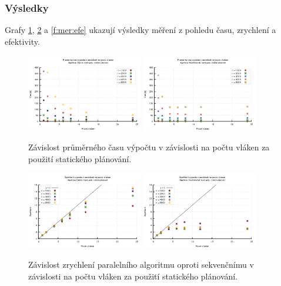 \subsubsection{Výsledky}
Grafy \ref{f:mer:cas}, \ref{f:mer:zry} a \ref{f:mer:efe} ukazují výsledky měření z pohledu času, zrychlení a efektivity.

\begin{figure}
    \centering
    \includegraphics[width=0.45\textwidth]{../grafy/02_openMP/02-01-Dijsktra_cas}
    \includegraphics[width=0.45\textwidth]{../grafy/02_openMP/02-01-Floyd_cas}
    \caption{Závislost průměrného času výpočtu v závislosti na počtu vláken za použití statického plánování.}
    \label{f:mer:cas}
\end{figure}

\begin{figure}
    \centering
    \includegraphics[width=0.45\textwidth]{../grafy/02_openMP/02-02-Dijsktra_zrychleni}
    \includegraphics[width=0.45\textwidth]{../grafy/02_openMP/02-02-Floyd_zrychleni}
    \caption{Závislost zrychlení paralelního algoritmu oproti sekvenčnímu v závislosti na počtu vláken za použití statického plánování.}
    \label{f:mer:zry}
\end{figure}

